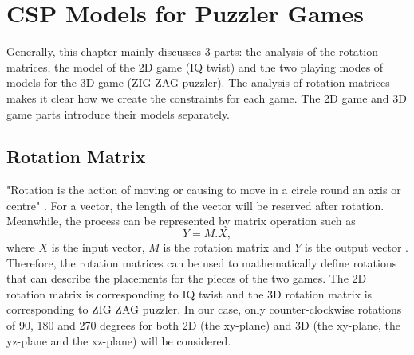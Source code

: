\chapter{CSP Models for Puzzler Games}
\label{cha:design}
Generally, this chapter mainly discusses 3 parts: the analysis of the rotation matrices, the model of the 2D game (IQ twist) and the two playing modes of models for the 3D game (ZIG ZAG puzzler). The analysis of rotation matrices makes it clear how we create the constraints for each game. The 2D game and 3D game parts introduce their models separately.
\section{Rotation Matrix}
"Rotation is the action of moving or causing to move in a circle round an axis or centre" \cite{r14}. For a vector, the length of the vector will be reserved after rotation. Meanwhile, the process can be represented by matrix operation such as 
\begin{equation}
Y=M.X,
\end{equation}
where $X$ is the input vector, $M$ is the rotation matrix and $Y$ is the output vector \cite{r15}. Therefore, the rotation matrices can be used to mathematically define rotations that can describe the placements for the pieces of the two games. The 2D rotation matrix is corresponding to IQ twist and the 3D rotation matrix is corresponding to ZIG ZAG puzzler. In our case, only counter-clockwise rotations of 90, 180 and 270 degrees for both 2D (the xy-plane) and 3D (the xy-plane, the yz-plane and the xz-plane) will be considered.
